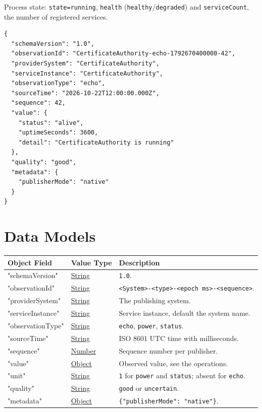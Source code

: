 \documentclass[a4paper]{arrowhead}
\newcommand{\oref}[1]{{\textcolor{ArrowheadBlue}{\hyperref[sec:operations:#1]{#1}}}}
\newcommand{\pref}[1]{{\textcolor{ArrowheadGrey}{\hyperref[sec:model:primitives:#1]{#1}}}}
\begin{document}
Process state: \texttt{state=\allowbreak{}running}, \texttt{health} (\texttt{healthy}/\texttt{degraded}) and \texttt{serviceCount}, the number of registered services.

\begin{lstlisting}[caption={An \oref{echo} observation.}]
{
  "schemaVersion": "1.0",
  "observationId": "CertificateAuthority-echo-1792670400000-42",
  "providerSystem": "CertificateAuthority",
  "serviceInstance": "CertificateAuthority",
  "observationType": "echo",
  "sourceTime": "2026-10-22T12:00:00.000Z",
  "sequence": 42,
  "value": {
    "status": "alive",
    "uptimeSeconds": 3600,
    "detail": "CertificateAuthority is running"
  },
  "quality": "good",
  "metadata": {
    "publisherMode": "native"
  }
}
\end{lstlisting}

\newpage

\section{Data Models}
\label{sec:model}


\noindent\begin{tabularx}{\textwidth}{| p{4.25cm} | p{3.5cm} | X |} \hline
\rowcolor{gray!33} Object Field & Value Type & Description \\ \hline
"schemaVersion" & \pref{String} & \texttt{1.0}. \\ \hline
"observationId" & \pref{String} & \texttt{<System>-<type>-<epoch ms>-<sequence>}. \\ \hline
"providerSystem" & \pref{String} & The publishing system. \\ \hline
"serviceInstance" & \pref{String} & Service instance, default the system name. \\ \hline
"observationType" & \pref{String} & \texttt{echo}, \texttt{power}, \texttt{status}. \\ \hline
"sourceTime" & \pref{String} & ISO 8601 UTC time with milliseconds. \\ \hline
"sequence" & \pref{Number} & Sequence number per publisher. \\ \hline
"value" & \pref{Object} & Observed value, see the operations. \\ \hline
"unit" & \pref{String} & \texttt{1} for \texttt{power} and \texttt{status}; absent for \texttt{echo}. \\ \hline
"quality" & \pref{String} & \texttt{good} or \texttt{uncertain}. \\ \hline
"metadata" & \pref{Object} & \texttt{\{"publisherMode": "native"\}}. \\ \hline
\end{tabularx}
\end{document}
